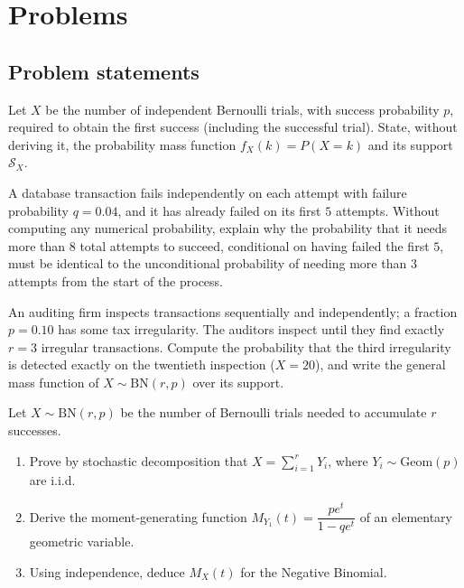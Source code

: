 \section*{Problems}

\subsection*{Problem statements}

\begin{problema}
	\label{prob:287fdc5}
	Let $X$ be the number of independent Bernoulli trials, with success probability $p$, required to obtain the first success (including the successful trial). State, without deriving it, the probability mass function $f_X(k) = P(X=k)$ and its support $\mathcal{S}_X$.
\end{problema}

\begin{problema}
	\label{prob:0ebda90}
	A database transaction fails independently on each attempt with failure probability $q=0.04$, and it has already failed on its first $5$ attempts. Without computing any numerical probability, explain why the probability that it needs more than $8$ total attempts to succeed, conditional on having failed the first $5$, must be identical to the unconditional probability of needing more than $3$ attempts from the start of the process.
\end{problema}

\begin{problema}
	\label{prob:6ccfa13}
	An auditing firm inspects transactions sequentially and independently; a fraction $p=0.10$ has some tax irregularity. The auditors inspect until they find exactly $r=3$ irregular transactions. Compute the probability that the third irregularity is detected exactly on the twentieth inspection ($X=20$), and write the general mass function of $X \sim \text{BN}(r,p)$ over its support.
\end{problema}

\begin{problema}
	\label{prob:a4a72f3}
	Let $X \sim \text{BN}(r,p)$ be the number of Bernoulli trials needed to accumulate $r$ successes.
	\begin{enumerate}
		\item Prove by stochastic decomposition that $X = \sum_{i=1}^r Y_i$, where $Y_i \sim \text{Geom}(p)$ are i.i.d.
		\item Derive the moment-generating function $M_{Y_1}(t) = \dfrac{pe^t}{1-qe^t}$ of an elementary geometric variable.
		\item Using independence, deduce $M_X(t)$ for the Negative Binomial.
	\end{enumerate}
\end{problema}

